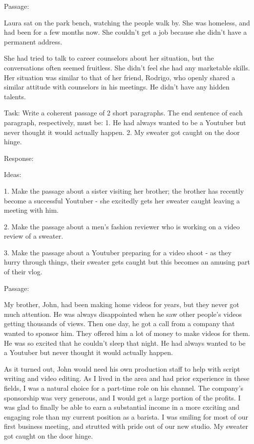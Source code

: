 \documentclass[11pt]{article}
\begin{document}
Passage: 

Laura sat on the park bench, watching the people walk by. She was homeless, and had been for a few months now. She couldn't get a job because she didn't have a permanent address.

She had tried to talk to career counselors about her situation, but the conversations often seemed fruitless. She didn't feel she had any marketable skills. Her situation was similar to that of her friend, Rodrigo, who openly shared a similar attitude with counselors in his meetings. He didn't have any hidden talents.

Task: Write a coherent passage of 2 short paragraphs. The end sentence of each paragraph, respectively, must be: 1. He had always wanted to be a Youtuber but never thought it would actually happen. 2. My sweater got caught on the door hinge.

Response:

Ideas:

1. Make the passage about a sister visiting her brother; the brother has recently become a successful Youtuber - she excitedly gets her sweater caught leaving a meeting with him.

2. Make the passage about a men's fashion reviewer who is working on a video review of a sweater.

3. Make the passage about a Youtuber preparing for a video shoot - as they hurry through things, their sweater gets caught but this becomes an amusing part of their vlog.

Passage:

My brother, John, had been making home videos for years, but they never got much attention. He was always disappointed when he saw other people's videos getting thousands of views. Then one day, he got a call from a company that wanted to sponsor him. They offered him a lot of money to make videos for them. He was so excited that he couldn't sleep that night. He had always wanted to be a Youtuber but never thought it would actually happen.

As it turned out, John would need his own production staff to help with script writing and video editing. As I lived in the area and had prior experience in these fields, I was a natural choice for a part-time role on his channel. The company's sponsorship was very generous, and I would get a large portion of the profits. I was glad to finally be able to earn a substantial income in a more exciting and engaging role than my current position as a barista. I was smiling for most of our first business meeting, and strutted with pride out of our new studio. My sweater got caught on the door hinge.
\end{document}
